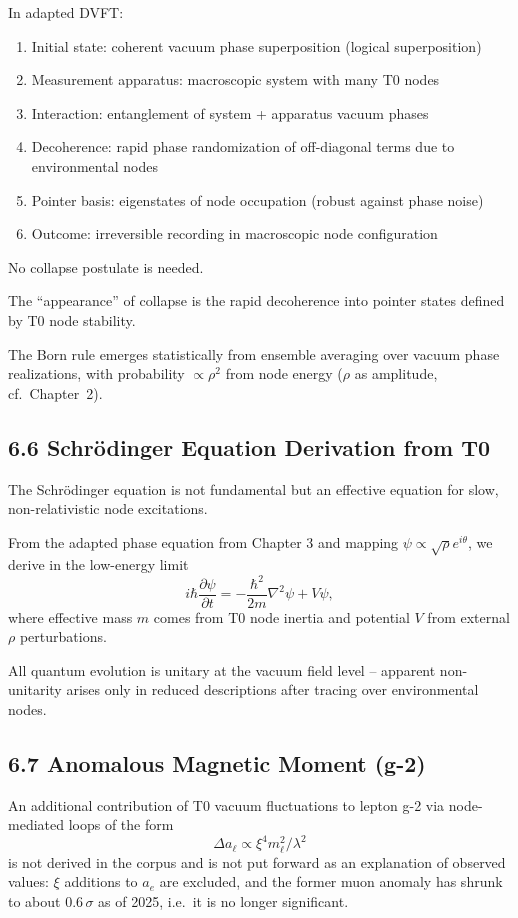 	In adapted DVFT:
	\begin{enumerate}
		\item Initial state: coherent vacuum phase superposition (logical superposition)
		\item Measurement apparatus: macroscopic system with many T0 nodes
		\item Interaction: entanglement of system + apparatus vacuum phases
		\item Decoherence: rapid phase randomization of off-diagonal terms due to environmental nodes
		\item Pointer basis: eigenstates of node occupation (robust against phase noise)
		\item Outcome: irreversible recording in macroscopic node configuration
	\end{enumerate}
	
	No collapse postulate is needed.
	
	The ``appearance'' of collapse is the rapid decoherence into pointer states defined by T0 node stability.
	
	The Born rule emerges statistically from ensemble averaging over vacuum phase realizations, with probability $\propto \rho^2$ from node energy ($\rho$ as amplitude, cf.\ Chapter~2).
	
	\subsection{6.6 Schrödinger Equation Derivation from T0}
	
	The Schrödinger equation is not fundamental but an effective equation for slow, non-relativistic node excitations.
	
	From the adapted phase equation from Chapter 3 and mapping $\psi \propto \sqrt{\rho} e^{i\theta}$, we derive in the low-energy limit
	\[
	i \hbar \frac{\partial \psi}{\partial t} = -\frac{\hbar^2}{2m} \nabla^2 \psi + V \psi,
	\]
	where effective mass $m$ comes from T0 node inertia and potential $V$ from external $\rho$ perturbations.
	
	All quantum evolution is unitary at the vacuum field level – apparent non-unitarity arises only in reduced descriptions after tracing over environmental nodes.
	
	\subsection{6.7 Anomalous Magnetic Moment (g-2)}
	
	An additional contribution of T0 vacuum fluctuations to lepton g-2 via node-mediated loops of the form
	\[
	\Delta a_\ell \propto \xi^4 m_\ell^2 / \lambda^2
	\]
	is not derived in the corpus and is not put forward as an explanation of observed values: $\xi$ additions to $a_e$ are excluded, and the former muon anomaly has shrunk to about $0.6\,\sigma$ as of 2025, i.e.\ it is no longer significant.
	
